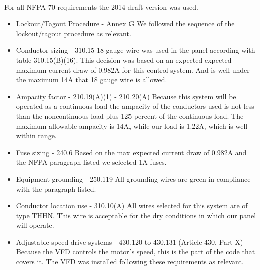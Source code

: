 \paragraph{} For all NFPA 70 requirements the 2014 draft version was used.

\begin{itemize}
	\item Lockout/Tagout Procedure - Annex G {\newline} {\indent}
	      We followed the sequence of the lockout/tagout procedure as relevant.

	\item Conductor sizing - 310.15 {\newline} {\indent}
	      18 gauge wire was used in the panel according with table 310.15(B)(16).
	      This decision was based on an  expected expected maximum current
	      draw of 0.982A for this control system.
	      And is well under the maximum 14A that 18 gauge wire is allowed.

	\item Ampacity factor - 210.19(A)(1) - 210.20(A) {\newline} {\indent}
	      Because this system will be operated as a continuous load the
	      ampacity of the conductors used is not less
	      than the noncontinuous load plus 125 percent of the continuous load.
	      The maximum allowable ampacity is 14A, while our load is 1.22A, which is well within range.

	\item Fuse sizing - 240.6 {\newline} {\indent}
	      Based on the max expected current draw of 0.982A and the NFPA
	      paragraph listed we selected 1A fuses.

	\item Equipment grounding - 250.119 {\newline} {\indent}
	      All grounding wires are green in compliance with the paragraph listed.

	\item Conductor location use - 310.10(A) {\newline} {\indent}
	      All wires selected for this system are of type THHN. This wire is
	      acceptable for the dry conditions in which
	      our panel will operate.

	\item Adjustable-speed drive systems - 430.120 to 430.131 (Article 430, Part X) {\newline} {\indent}
	      Because the VFD controls the motor’s speed, this is the part of the code that covers it. The VFD was installed following these requirements as relevant.


\end{itemize}
